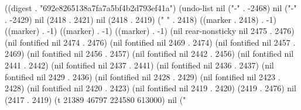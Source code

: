 
((digest . "692e8265138a7fa7a5bf4b2d793ef41a") (undo-list nil ("-" . -2468) nil ("-" . -2429) nil (2418 . 2421) nil (2418 . 2419) ("     " . 2418) ((marker . 2418) . -1) ((marker) . -1) ((marker) . -1) ((marker) . -1) (nil rear-nonsticky nil 2475 . 2476) (nil fontified nil 2474 . 2476) (nil fontified nil 2469 . 2474) (nil fontified nil 2457 . 2469) (nil fontified nil 2456 . 2457) (nil fontified nil 2442 . 2456) (nil fontified nil 2441 . 2442) (nil fontified nil 2437 . 2441) (nil fontified nil 2436 . 2437) (nil fontified nil 2429 . 2436) (nil fontified nil 2428 . 2429) (nil fontified nil 2423 . 2428) (nil fontified nil 2420 . 2423) (nil fontified nil 2419 . 2420) (2419 . 2476) nil (2417 . 2419) (t 21389 46797 224580 613000) nil ("%
